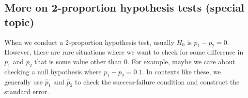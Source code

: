 



\D{\newpage}

\subsection{More on 2-proportion hypothesis tests (special topic)}

When we conduct a 2-proportion hypothesis test,
usually $H_0$ is $p_1 - p_2 = 0$. However, there are rare
situations where we want to check for some difference in
$p_1$ and $p_2$ that is some value other than 0.
For example, maybe we care about checking a null hypothesis
where $p_1 - p_2 = 0.1$. %
In contexts like these, we generally use $\hat{p}_1$ and
$\hat{p}_2$ to check the success-failure condition and
construct the standard error.


